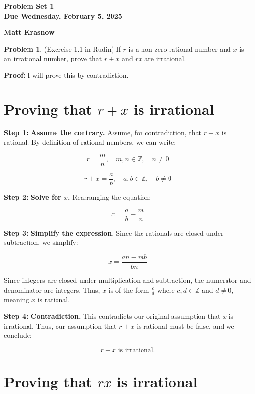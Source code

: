 \documentclass[12pt,oneside]{article}
\theoremstyle{definition}
\newtheorem{problem}{Problem}
\begin{document}
\pagestyle{fancy}


\begin{center}
\bf \Large
Problem Set 1 \\[0.5 em]
\large
Due Wednesday, February 5, 2025
\end{center}
\begin{center}
\bf \Large
Matt Krasnow
\end{center}

\bigskip

\begin{problem}
(Exercise 1.1 in Rudin) 
If $r$ is a non-zero rational number and $x$ is an irrational number, prove that $r + x$ and $r x$ are irrational. 
\end{problem}


\textbf{Proof:} I will prove this by contradiction.

\section*{Proving that $r + x$ is irrational}  

\textbf{Step 1: Assume the contrary.}  
Assume, for contradiction, that $r + x$ is rational.  
By definition of rational numbers, we can write:

\[
r = \frac{m}{n}, \quad m, n \in \mathbb{Z}, \quad n \neq 0
\]

\[
r + x = \frac{a}{b}, \quad a, b \in \mathbb{Z}, \quad b \neq 0
\]

\textbf{Step 2: Solve for $x$.}  
Rearranging the equation:

\[
x = \frac{a}{b} - \frac{m}{n}
\]

\textbf{Step 3: Simplify the expression.}  
Since the rationals are closed under subtraction, we simplify:

\[
x = \frac{a n - m b}{b n}
\]

Since integers are closed under multiplication and subtraction, the numerator and denominator are integers.  
Thus, $x$ is of the form $\frac{c}{d}$ where $c, d \in \mathbb{Z}$ and $d \neq 0$, meaning $x$ is rational.

\textbf{Step 4: Contradiction.}  
This contradicts our original assumption that $x$ is irrational.  
Thus, our assumption that $r + x$ is rational must be false, and we conclude:

\[
r + x \text{ is irrational.}
\]

\section*{Proving that $r x$ is irrational}
\end{document}
